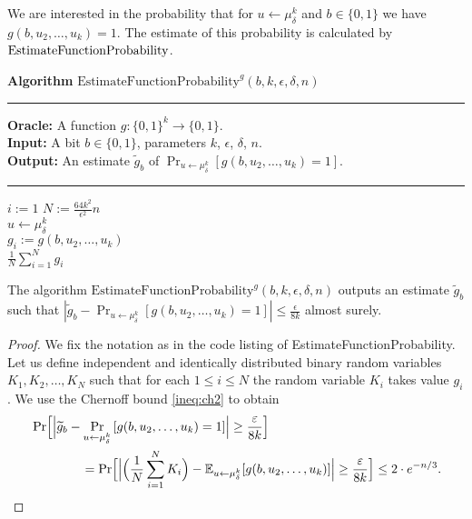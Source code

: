 We are interested in the probability that for $u \leftarrow \mu_{\delta}^k$ and $b \in \{0,1\}$ we have $g(b,u_2, \dotsc, u_k) = 1$.
The estimate of this probability is calculated by $\operatorname{\text{EstimateFunctionProbability}}$.
%
\begin{codeblock}
  \textbf{Algorithm} $\text{EstimateFunctionProbability}^{g}(b, k, \epsilon, \delta, n)$
  \medskip\hrule
  \textbf{Oracle:} A function $g : \{0,1\}^{k} \rightarrow \{0,1\}$.\\
  \textbf{Input:} A bit $b \in \{0,1\}$, parameters $k$, $\epsilon$, $\delta$, $n$. \\
  \textbf{Output:} An estimate $\widetilde{g}_b$ of $\Pr_{u \leftarrow \mu_{\delta}^{k}}[g(b,u_2, \dotsc, u_k) = 1]$.
  \medskip\hrule
  \For $i:=1$ \To $N := \frac{64k^2}{\epsilon^2} n$ \Do \\
  \IndI $u \leftarrow \mu_{\delta}^{k}$ \\
  \IndI $g_i := g(b, u_2, \dotsc, u_k)$ \\
  \Return $\frac{1}{N} \sum_{i=1}^{N} g_i$
\end{codeblock}
%
%
\begin{lemma}
  \label{lemma:estimate_of_g}
  The algorithm $\text{EstimateFunctionProbability}^{g}(b, k, \epsilon, \delta, n)$ outputs an estimate $\widetilde{g}_b$
  such that $| \widetilde{g}_b - \Pr_{u \leftarrow \mu_{\delta}^{k}}\left[g(b,u_2, \dots, u_k) = 1\right] | \leq \frac{\epsilon}{8k}$ almost surely.
\end{lemma}
%
\begin{proof}
We fix the notation as in the code listing of EstimateFunctionProbability.
Let us define independent and identically distributed binary random variables $K_1, K_2, \dots, K_N$
such that for each $1 \leq i \leq N$ the random variable $K_i$ takes value $g_i$. We use the Chernoff bound \eqref{ineq:ch2} to obtain
\begin{align*}
  &\Pr \Bigl[ \Bigl| \widetilde{g}_b - \Pr_{u \leftarrow \mu_{\delta}^{k}}\left[g(b,u_2, \dots, u_k) = 1\right] \Bigr| \geq \frac{\varepsilon}{8k} \Bigr]\\
  &\mbox\qquad\qquad = \Pr \Bigl[\Bigl|\Bigl(\frac{1}{N} \sum_{i=1}^N K_i \Bigr) - \mathbb{E}_{u \leftarrow \mu_{\delta}^k}[g(b,u_2, \dots, u_k)]\Bigr|
    \geq \frac{\varepsilon}{8k} \Bigr] \leq 2 \cdot e^{-n/3}.
\end{align*}
\end{proof}
